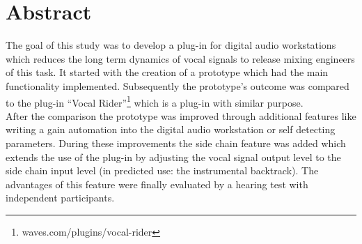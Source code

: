 \chapter*{Abstract}

The goal of this study was to develop a plug-in for digital audio workstations which reduces the long term dynamics of vocal signals to release mixing engineers of this task. It started with the creation of a prototype which had the main functionality implemented. Subsequently the prototype's outcome was compared to the plug-in “Vocal Rider”\footnote{waves.com/plugins/vocal-rider} which is a plug-in with similar purpose.\\
After the comparison the prototype was improved through additional features like writing a gain automation into the digital audio workstation or self detecting parameters. During these improvements the side chain feature was added which extends the use of the plug-in by adjusting the vocal signal output level to the side chain input level (in predicted use: the instrumental backtrack). The advantages of this feature were finally evaluated by a hearing test with independent participants.